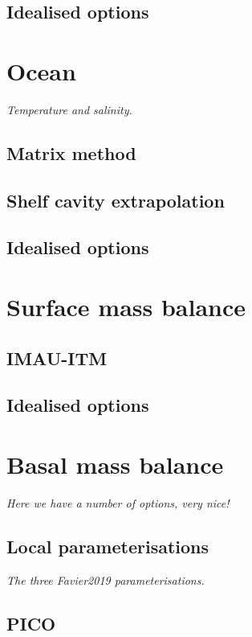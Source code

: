 \documentclass{article}
\begin{document}
\subsection{Idealised options}

\newpage
\section{Ocean}

\textit{Temperature and salinity.}

\subsection{Matrix method}

\subsection{Shelf cavity extrapolation}

\subsection{Idealised options}

\newpage
\section{Surface mass balance}

\subsection{IMAU-ITM}

\subsection{Idealised options}

\newpage
\section{Basal mass balance}

\textit{Here we have a number of options, very nice!}

\subsection{Local parameterisations}

\textit{The three Favier2019 parameterisations.}

\subsection{PICO}
\end{document}
